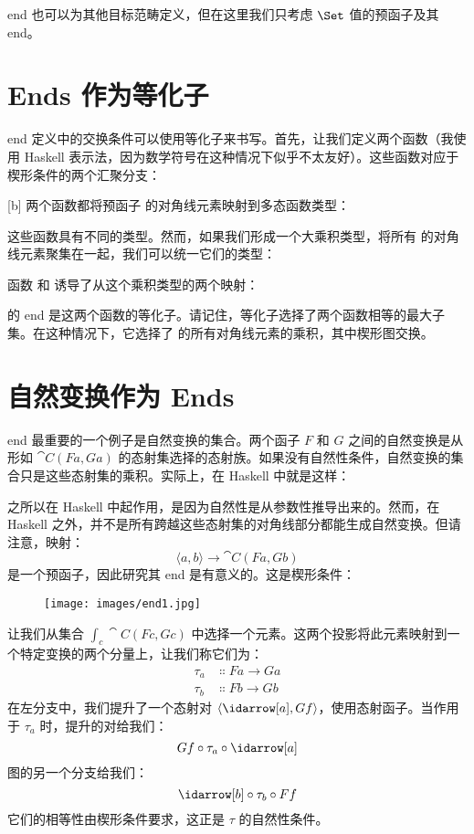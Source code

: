 end 也可以为其他目标范畴定义，但在这里我们只考虑 $\Set$ 值的预函子及其 end。

\section{Ends 作为等化子}

end 定义中的交换条件可以使用等化子来书写。首先，让我们定义两个函数（我使用 Haskell 表示法，因为数学符号在这种情况下似乎不太友好）。这些函数对应于楔形条件的两个汇聚分支：

[b]
两个函数都将预函子  的对角线元素映射到多态函数类型：

这些函数具有不同的类型。然而，如果我们形成一个大乘积类型，将所有  的对角线元素聚集在一起，我们可以统一它们的类型：

函数  和  诱导了从这个乘积类型的两个映射：

 的 end 是这两个函数的等化子。请记住，等化子选择了两个函数相等的最大子集。在这种情况下，它选择了  的所有对角线元素的乘积，其中楔形图交换。

\section{自然变换作为 Ends}

end 最重要的一个例子是自然变换的集合。两个函子 $F$ 和 $G$ 之间的自然变换是从形如 $\cat{C}(F a, G a)$ 的态射集选择的态射族。如果没有自然性条件，自然变换的集合只是这些态射集的乘积。实际上，在 Haskell 中就是这样：

之所以在 Haskell 中起作用，是因为自然性是从参数性推导出来的。然而，在 Haskell 之外，并不是所有跨越这些态射集的对角线部分都能生成自然变换。但请注意，映射：
\[\langle a, b \rangle \to \cat{C}(F a, G b)\]
是一个预函子，因此研究其 end 是有意义的。这是楔形条件：

\begin{figure}[H]
  \centering
  \texttt{[image: images/end1.jpg]}
\end{figure}

\noindent
让我们从集合 $\int_c \cat{C}(F c, G c)$ 中选择一个元素。这两个投影将此元素映射到一个特定变换的两个分量上，让我们称它们为：
\begin{align*}
  \tau_a & \Colon F a \to G a \\
  \tau_b & \Colon F b \to G b
\end{align*}
在左分支中，我们提升了一个态射对 $\langle \idarrow[a], G f \rangle$，使用态射函子。当作用于 $\tau_a$ 时，提升的对给我们：
\[G f \circ \tau_a \circ \idarrow[a]\]
图的另一个分支给我们：
\[\idarrow[b] \circ \tau_b \circ F f\]
它们的相等性由楔形条件要求，这正是 $\tau$ 的自然性条件。

